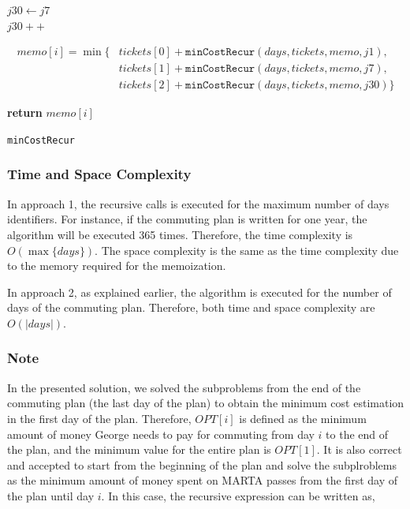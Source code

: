 \documentclass{article}
\begin{document}
\begin{itemize}
\begin{center}
\begin{minipage}{0.8\linewidth}
{\begin{algorithm}[H]
			$j30 \leftarrow j7$\\			
			 {$j30++$}	
						

					
			\begin{equation*}	
			\begin{split}
				memo[i] = \min\{ & tickets[0] + \texttt{minCostRecur}(days, tickets, memo, j1),\\
				 & tickets[1] + \texttt{minCostRecur}(days, tickets, memo, j7),\\
				 & tickets[2] + \texttt{minCostRecur}(days, tickets, memo, j30)\}
			\end{split}
			\end{equation*}
			
			\bigskip
			
			{\bf return} $memo[i]$
			\caption{\texttt{minCostRecur}} %
			\label{alg2-rec}   %
		\end{algorithm}
	}
	\end{minipage}
\end{center}
\end{itemize}



\subsubsection*{Time and Space Complexity}
In approach 1, the recursive calls is executed for the maximum number of days identifiers. For instance, if the commuting plan is written for one year, the algorithm will be executed 365 times. Therefore, the time complexity is $O(\max\{days\})$. The space complexity is the same as the time complexity due to the memory required for the memoization.

\noindent In approach 2, as explained earlier, the algorithm is executed for the number of days of the commuting plan. Therefore, both time and space complexity are $O(|days|)$.




\subsubsection*{Note}
In the presented solution, we solved the subproblems from the end of the commuting plan (the last day of the plan) to obtain the minimum cost estimation in the first day of the plan. Therefore, $OPT[i]$ is defined as the minimum amount of money George needs to pay for commuting from day $i$ to the end of the plan, and the minimum value for the entire plan is $OPT[1]$. It is also correct and accepted to start from the beginning of the plan and solve the subplroblems as the minimum amount of money spent on MARTA passes from the first day of the plan until day $i$. In this case, the recursive expression can be written as,
\end{document}
